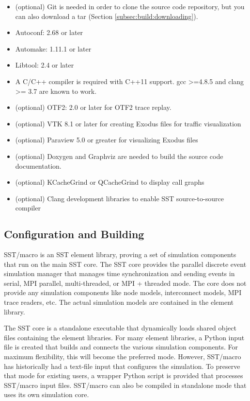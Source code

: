 \begin{itemize}
\item (optional) Git is needed in order to clone the source code repository, but you can also download a tar (Section \ref{subsec:build:downloading}).
\item Autoconf: 2.68 or later 
\item Automake: 1.11.1 or later 
\item Libtool: 2.4 or later 
\item A C/C++ compiler is required with C++11 support.  gcc >=4.8.5 and clang >= 3.7 are known to work.
\item (optional) OTF2: 2.0 or later for OTF2 trace replay.
\item (optional) VTK 8.1 or later for creating Exodus files for traffic visualization
\item (optional) Paraview 5.0 or greater for visualizing Exodus files
\item (optional) Doxygen and Graphviz are needed to build the source code documentation.
\item (optional) KCacheGrind or QCacheGrind to display call graphs
\item (optional) Clang development libraries to enable SST source-to-source compiler
\end{itemize}

\subsection{Configuration and Building}
\label{subsec:build:configure}

SST/macro is an SST element library, proving a set of simulation components that run on the main SST core.  
The SST core provides the parallel discrete event simulation manager that manages time synchronization and sending events in serial, MPI parallel, multi-threaded, or MPI + threaded mode.  
The core does not provide any simulation components like node models, interconnect models, MPI trace readers, etc.  
The actual simulation models are contained in the element library.  

The SST core is a standalone executable that dynamically loads shared object files containing the element libraries.  
For many element libraries, a Python input file is created that builds and connects the various simulation components.  
For maximum flexibility, this will become the preferred mode.  
However, SST/macro has historically had a text-file input  that configures the simulation.  
To preserve that mode for existing users, a wrapper Python script is provided that processes SST/macro input files.  
SST/macro can also be compiled in standalone mode that uses its own simulation core.


